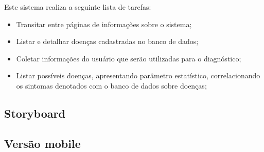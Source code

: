 Este sistema realiza a seguinte lista de tarefas:
\begin{itemize}
	\item Transitar entre páginas de informações sobre o sistema;
	\item Listar e detalhar doenças cadastradas no banco de dados;
	\item Coletar informações do usuário que serão utilizadas para o diagnóstico;
	\item Listar possíveis doenças, apresentando parâmetro estatístico, correlacionando os sintomas denotados com o banco de dados sobre doenças;
\end{itemize}

\subsection{Storyboard}

\subsection{Versão mobile}

